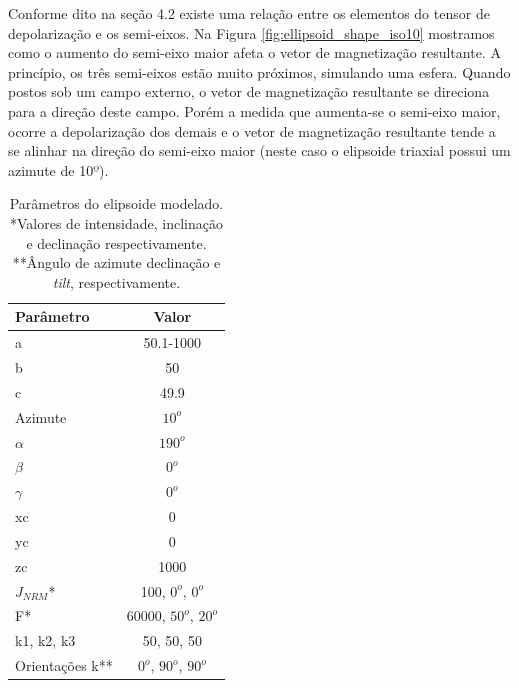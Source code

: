 Conforme dito na seção 4.2 existe uma relação entre os elementos do tensor de depolarização e os semi-eixos. Na Figura \ref{fig:ellipsoid_shape_iso10} mostramos como o aumento do semi-eixo maior afeta o vetor de magnetização resultante. A princípio, os três semi-eixos estão muito próximos, simulando uma esfera. Quando postos sob um campo externo, o vetor de magnetização resultante se direciona para a direção deste campo. Porém a medida que aumenta-se o semi-eixo maior, ocorre a depolarização dos demais e o vetor de magnetização resultante tende a se alinhar na direção do semi-eixo maior (neste caso o elipsoide triaxial possui um azimute de 10$º$).

\begin{table}[h]
	\begin{center}
		\begin{tabular}{|l|c|}
			\hline
			\textbf{Parâmetro}  & \textbf{Valor}  \\
			\hline 
			a   & 50.1-1000 \\
			\hline
			b   & 50  \\
			\hline
			c   & 49.9 \\
			\hline
			Azimute   & $10^o$ \\
			\hline
			$\alpha$    & $190^o$   \\
			\hline
			$\beta$    & $0^o$ \\
			\hline
			$\gamma$   & $0^o$  \\
			\hline
			xc   & 0  \\
			\hline          
			yc   & 0  \\
			\hline                
			zc   & 1000  \\
			\hline
			$J_{NRM}$*  & 100, $0^o$, $0^o$  \\
			\hline
			F*    & 60000, $50^o$, $20^o$ \\
			\hline
			k1, k2, k3   & 50, 50, 50  \\
			\hline
			Orientações k**   & $0^o$, $90^o$, $90^o$  \\
			\hline
		\end{tabular}
		\caption{Parâmetros do elipsoide modelado. *Valores de intensidade, inclinação e declinação respectivamente. **Ângulo de azimute
			declinação e \textit{tilt}, respectivamente.}
	\end{center}
	\label{tab:ellipsoid_shape_iso10}
\end{table}

